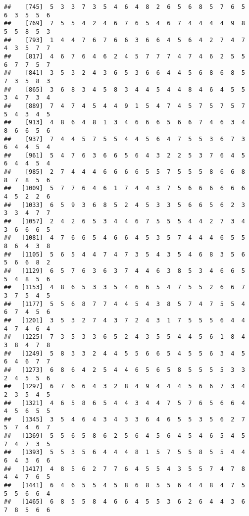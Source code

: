 \documentclass[
]{book}
\begin{document}
\begin{verbatim}
##    [745]  5  3  3  7  3  5  4  6  4  8  2  6  5  6  8  5  7  6  5  6  3  5  5  6
##    [769]  7  5  5  4  2  4  6  7  6  5  4  6  7  4  4  4  4  9  8  5  5  8  5  3
##    [793]  1  4  4  7  6  7  6  6  3  6  6  4  5  6  4  2  7  4  7  4  3  5  7  7
##    [817]  4  6  7  6  4  6  2  4  5  7  7  7  4  7  4  6  2  5  5  6  7  7  5  7
##    [841]  3  5  3  2  4  3  6  5  3  6  6  4  4  5  6  8  6  8  5  7  3  5  8  3
##    [865]  3  6  8  3  4  5  8  3  4  4  5  4  4  8  4  6  4  5  5  3  4  7  3  4
##    [889]  7  4  7  4  5  4  4  9  1  5  4  7  4  5  7  5  7  5  7  5  4  3  4  5
##    [913]  4  8  6  4  8  1  3  4  6  6  6  5  6  6  7  4  6  3  4  8  6  6  5  6
##    [937]  7  4  4  5  7  5  5  4  4  5  6  4  7  5  5  3  6  7  3  6  4  4  5  4
##    [961]  5  4  7  6  3  6  6  5  6  4  3  2  2  5  3  7  6  4  5  6  4  4  5  4
##    [985]  2  7  4  4  4  6  6  6  6  5  5  7  5  5  5  8  6  6  8  8  7  8  5  6
##   [1009]  5  7  7  6  4  6  1  7  4  4  3  7  5  6  6  6  6  6  6  4  5  2  2  6
##   [1033]  6  5  9  3  6  8  5  2  4  5  3  3  5  6  6  5  6  2  3  3  3  4  7  7
##   [1057]  2  4  2  6  5  3  4  4  6  7  5  5  5  4  4  2  7  3  4  3  6  6  6  5
##   [1081]  4  7  6  6  5  4  6  6  4  5  3  5  7  4  4  4  6  5  5  8  6  4  3  8
##   [1105]  5  6  5  4  4  7  4  7  3  5  4  3  5  4  6  8  3  5  6  5  6  6  8  2
##   [1129]  6  5  7  6  3  6  3  7  4  4  6  3  8  5  3  4  6  6  5  5  4  8  5  6
##   [1153]  4  8  6  5  3  3  5  4  6  6  5  4  7  5  5  2  6  6  7  3  7  5  4  5
##   [1177]  5  5  6  8  7  7  4  4  5  4  3  8  5  7  4  7  5  5  4  6  7  4  5  6
##   [1201]  3  5  3  2  7  4  3  7  2  4  3  1  7  5  5  5  6  4  4  4  7  4  6  4
##   [1225]  7  3  5  3  3  6  5  2  4  3  5  5  4  4  5  6  1  8  4  3  8  4  7  8
##   [1249]  5  8  3  3  2  4  4  5  5  6  6  5  4  5  5  6  3  4  5  6  4  6  7  7
##   [1273]  6  8  6  4  2  5  4  4  6  5  6  5  8  5  5  5  5  3  3  2  4  5  5  6
##   [1297]  6  7  6  6  4  3  2  8  4  9  4  4  4  5  6  6  7  3  4  2  3  5  4  5
##   [1321]  4  6  5  8  6  5  4  4  3  4  4  7  5  7  6  5  6  6  4  4  5  6  5  5
##   [1345]  3  5  4  6  4  3  4  3  3  6  4  6  5  5  3  5  6  2  7  5  7  4  6  7
##   [1369]  5  5  6  5  8  6  2  5  6  4  5  6  4  5  4  6  5  4  5  7  4  7  3  5
##   [1393]  5  5  3  5  6  4  4  4  8  1  5  7  5  5  8  5  5  4  4  6  4  3  6  6
##   [1417]  4  8  5  6  2  7  7  6  4  5  5  4  3  5  5  7  4  7  8  4  4  7  6  5
##   [1441]  6  4  6  5  5  4  5  8  6  8  5  5  6  4  4  8  4  7  5  5  5  6  6  4
##   [1465]  6  8  5  5  8  4  6  6  4  5  5  3  6  2  6  4  4  3  6  7  8  5  6  6

\end{verbatim}
\end{document}
